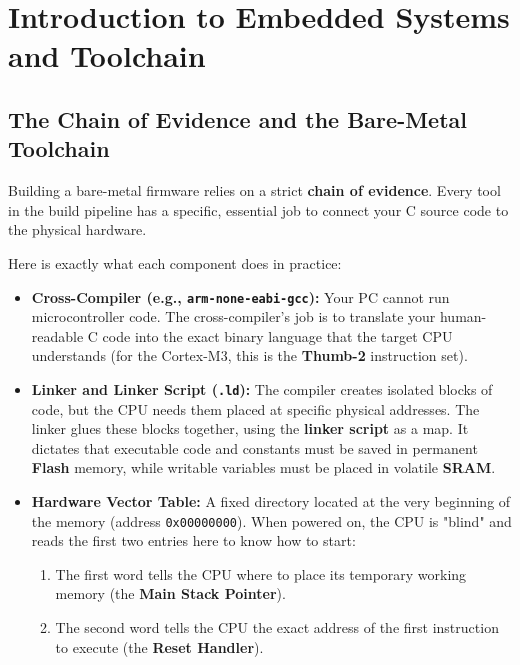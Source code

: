\chapter{Introduction to Embedded Systems and Toolchain}

\section{The Chain of Evidence and the Bare-Metal Toolchain}
Building a bare-metal firmware relies on a strict \textbf{chain of evidence}. Every tool in the build pipeline has a specific, essential job to connect your C source code to the physical hardware. 

Here is exactly what each component does in practice:

\begin{itemize}
    \item \textbf{Cross-Compiler (e.g., \texttt{arm-none-eabi-gcc}):} Your PC cannot run microcontroller code. The cross-compiler's job is to translate your human-readable C code into the exact binary language that the target CPU understands (for the Cortex-M3, this is the \textbf{Thumb-2} instruction set).
    
    \item \textbf{Linker and Linker Script (\texttt{.ld}):} The compiler creates isolated blocks of code, but the CPU needs them placed at specific physical addresses. The linker glues these blocks together, using the \textbf{linker script} as a map. It dictates that executable code and constants must be saved in permanent \textbf{Flash} memory, while writable variables must be placed in volatile \textbf{SRAM}.
    
    \item \textbf{Hardware Vector Table:} A fixed directory located at the very beginning of the memory (address \texttt{0x00000000}). When powered on, the CPU is "blind" and reads the first two entries here to know how to start:
    \begin{enumerate}
        \item The first word tells the CPU where to place its temporary working memory (the \textbf{Main Stack Pointer}).
        \item The second word tells the CPU the exact address of the first instruction to execute (the \textbf{Reset Handler}).
    \end{enumerate}
    

\end{itemize}
